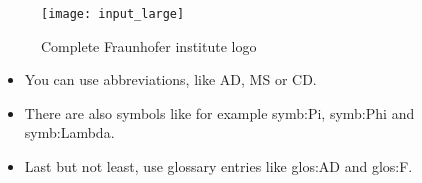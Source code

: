 \documentclass[12pt]%
{article}
\begin{document}
\begin{figure}[h]
    \centering
    \texttt{[image: input\_large]}
    \caption{Complete Fraunhofer institute logo}
    \label{fig:logo_long}
\end{figure}


\begin{itemize}
\item You can use abbreviations, like \gls{AD}, \gls{MS} or \gls{CD}.
\item There are also symbols like for example \gls{symb:Pi}, \gls{symb:Phi} and \gls{symb:Lambda}.
\item Last but not least, use glossary entries like \gls{glos:AD} and \gls{glos:F}.
\end{itemize}
\newpage

\printglossary[style=altlist,title=Glossary]
 
\printglossary[type=\acronymtype,style=long]
 
\printglossary[type=symbolslist,style=long]

\newpage



\end{document}
